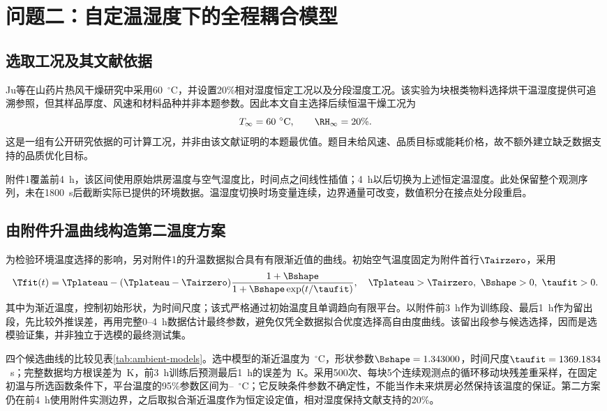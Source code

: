 \section{问题二：自定温湿度下的全程耦合模型}
\subsection{选取工况及其文献依据}
Ju等在山药片热风干燥研究中采用60~$^\circ$C，并设置20\%相对湿度恒定工况以及分段湿度工况\cite{ju2016}。该实验为块根类物料选择烘干温湿度提供可追溯参照，但其样品厚度、风速和材料品种并非本题参数。因此本文自主选择后续恒温干燥工况为
\begin{equation}
\Tinf=\EnvTempC{}~^\circ\mathrm{C},\qquad\RH_\infty=\EnvRHPercent{}\%.
\end{equation}
这是一组有公开研究依据的可计算工况，并非由该文献证明的本题最优值。题目未给风速、品质目标或能耗价格，故不额外建立缺乏数据支持的品质优化目标。

附件1覆盖前4~h，该区间使用原始烘房温度与空气湿度比，时间点之间线性插值；4~h以后切换为上述恒定温湿度。此处保留整个观测序列，未在1800~s后截断实际已提供的环境数据。温湿度切换时场变量连续，边界通量可改变，数值积分在接点处分段重启。

\subsection{由附件升温曲线构造第二温度方案}
为检验环境温度选择的影响，另对附件1的升温数据拟合具有有限渐近值的曲线。初始空气温度固定为附件首行$\Tairzero$，采用
\begin{equation}
\Tfit(\t)=\Tplateau-(\Tplateau-\Tairzero)\frac{1+\Bshape}{1+\Bshape\exp(\t/\taufit)},\quad\Tplateau>\Tairzero,\ \Bshape>0,\ \taufit>0.\label{eq:fit}
\end{equation}
其中\Tplateau{}为渐近温度，\Bshape{}控制初始形状，\taufit{}为时间尺度；该式严格通过初始温度且单调趋向有限平台。以附件前3~h作为训练段、最后1~h作为留出段，先比较外推误差，再用完整0--4~h数据估计最终参数，避免仅凭全数据拟合优度选择高自由度曲线。该留出段参与候选选择，因而是选模验证集，并非独立于选模的最终测试集。

四个候选曲线的比较见表\ref{tab:ambient-models}。选中模型的渐近温度为\FitTempC{}~$^\circ$C，形状参数$\Bshape=\FitShapeB$，时间尺度$\taufit=\FitTauS$~s；完整数据均方根误差为\FitRMSE{}~K，前3~h训练后预测最后1~h的误差为\FitHoldoutRMSE{}~K。采用500次、每块5个连续观测点的循环移动块残差重采样，在固定初温与所选函数条件下，平台温度的95\%参数区间为\FitTempLowC{}--\FitTempHighC{}~$^\circ$C；它反映条件参数不确定性，不能当作未来烘房必然保持该温度的保证。第二方案仍在前4~h使用附件实测边界，之后取拟合渐近温度作为恒定设定值，相对湿度保持文献支持的20\%。

